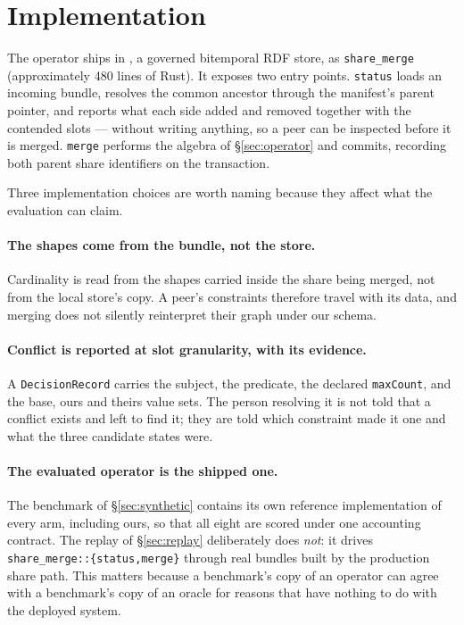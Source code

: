 \section{Implementation}
\label{sec:impl}

The operator ships in \sys, a governed bitemporal RDF store, as
\texttt{share\_merge} (approximately 480 lines of Rust). It exposes two entry
points. \texttt{status} loads an incoming bundle, resolves the common ancestor
through the manifest's parent pointer, and reports what each side added and
removed together with the contended slots --- without writing anything, so a
peer can be inspected before it is merged. \texttt{merge} performs the algebra
of \S\ref{sec:operator} and commits, recording both parent share identifiers on
the transaction.

Three implementation choices are worth naming because they affect what the
evaluation can claim.

\paragraph{The shapes come from the bundle, not the store.} Cardinality is read
from the shapes carried inside the share being merged, not from the local
store's copy. A peer's constraints therefore travel with its data, and merging
does not silently reinterpret their graph under our schema.

\paragraph{Conflict is reported at slot granularity, with its evidence.} A
\texttt{DecisionRecord} carries the subject, the predicate, the declared
\texttt{maxCount}, and the base, ours and theirs value sets. The person
resolving it is not told that a conflict exists and left to find it; they are
told which constraint made it one and what the three candidate states were.

\paragraph{The evaluated operator is the shipped one.} The benchmark of
\S\ref{sec:synthetic} contains its own reference implementation of every arm,
including ours, so that all eight are scored under one accounting contract. The
replay of \S\ref{sec:replay} deliberately does \emph{not}: it drives
\texttt{share\_merge::\{status,merge\}} through real bundles built by the
production share path. This matters because a benchmark's copy of an operator
can agree with a benchmark's copy of an oracle for reasons that have nothing to
do with the deployed system.
